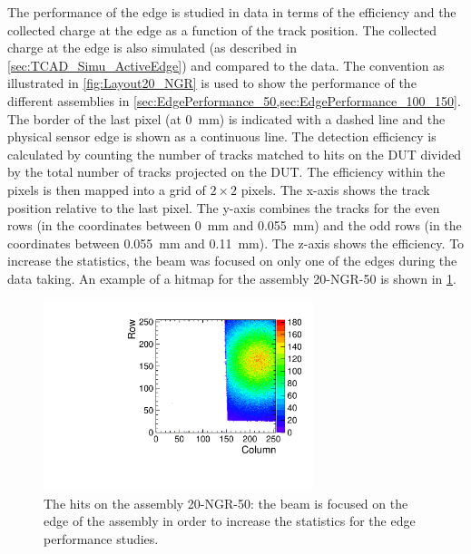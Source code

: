 The performance of the edge is studied in data in terms of the
efficiency and the collected charge at the edge as a function of the
track position. The collected charge at the edge is also simulated (as
described in \cref{sec:TCAD_Simu_ActiveEdge}) and compared to the
data. The convention as illustrated in \cref{fig:Layout20_NGR} is used
to show the performance of the different assemblies in
\cref{sec:EdgePerformance_50,sec:EdgePerformance_100_150}. The border
of the last pixel (at 0~mm) is indicated with a dashed line and the
physical sensor edge is shown as a continuous line. The detection
efficiency is calculated by counting the number of tracks matched to
hits on the DUT divided by the total number of tracks projected on the
DUT. The efficiency within the pixels is then mapped into a grid of
$2\times2$ pixels. The x-axis shows the track position relative to the
last pixel. The y-axis combines the tracks for the even rows (in the
coordinates between 0~mm and 0.055~mm) and the odd rows (in the
coordinates between 0.055~mm and 0.11~mm). The z-axis shows the
efficiency. To increase the statistics, the beam was focused on only
one of the edges during the data taking. An example of a hitmap for
the assembly 20-NGR-50 is shown in \cref{fig:hitMapW19G7}.

\begin{figure}[htbp]
  \centering
  \includegraphics[width=0.7\textwidth]{figures/ActiveEdge/hitMap_W19_G7.pdf}
  \caption{The hits on the assembly 20-NGR-50: the beam is focused on the
    edge of the assembly in order to increase the statistics for the
    edge performance studies.}
  \label{fig:hitMapW19G7}
\end{figure}


